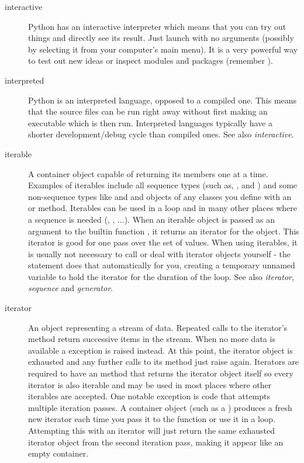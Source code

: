 \begin{description}
\item[interactive]{Python has an interactive interpreter which means that
you can try out things and directly see its result.  Just launch
{} with no arguments (possibly by selecting it from your
computer's main menu).  It is a very powerful way to test out new ideas or
inspect modules and packages (remember ).}

\item[interpreted]{Python is an interpreted language, opposed to a compiled
one.  This means that the source files can be run right away without first
making an executable which is then run.  Interpreted languages typically have
a shorter development/debug cycle than compiled ones.  See also
{}\emph{interactive}.}

\item[iterable]{A container object capable of returning its members one at a
time.  Examples of iterables include all sequence types (such as,
{}, and ) and some non-sequence types like
{} and  and objects of any classes you define with
an  or  method.  Iterables can be
used in a  loop and in many other places where a sequence is
needed (, , ...).  When an iterable object is
passed as an argument to the builtin function , it returns
an iterator for the object.  This iterator is good for one pass over the set
of values.  When using iterables, it is usually not necessary to call
{} or deal with iterator objects yourself - the 
statement does that automatically for you, creating a temporary unnamed
variable to hold the iterator for the duration of the loop.  See also
\emph{iterator}, \emph{sequence} and \emph{generator}.}

\item[iterator]{An object representing a stream of data.  Repeated calls to
the iterator's  method return successive items in the
stream.  When no more data is available a 
exception is raised instead.  At this point, the iterator object is exhausted
and any further calls to its  method just raise
{} again.  Iterators are required to have an
{} method that returns the iterator object itself so
every iterator is also iterable and may be used in most places where other
iterables are accepted.  One notable exception is code that attempts
multiple iteration passes.  A container object (such as a )
produces a fresh new iterator each time you pass it to the 
function or use it in a  loop.  Attempting this with an iterator
will just return the same exhausted iterator object from the second iteration
pass, making it appear like an empty container.}


\end{description}
